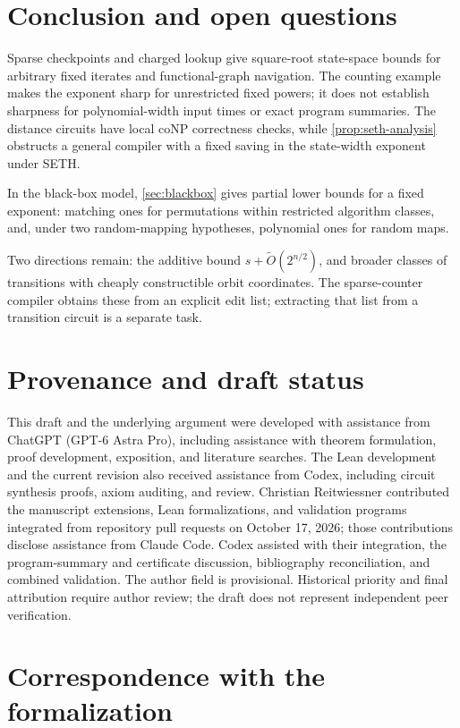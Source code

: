 \documentclass[11pt]{article}
\theoremstyle{definition}
\theoremstyle{remark}
\numberwithin{equation}{section}
\begin{document}
\section{Conclusion and open questions}\label{sec:scope}

Sparse checkpoints and charged lookup give square-root state-space bounds
for arbitrary fixed iterates and functional-graph navigation.  The counting
example makes the exponent sharp for unrestricted fixed powers; it does not
establish sharpness for polynomial-width input times or exact program summaries.
The distance circuits have local coNP correctness checks, while
\cref{prop:seth-analysis} obstructs a general compiler with a fixed saving
in the state-width exponent under SETH.

In the black-box model, \cref{sec:blackbox} gives partial lower bounds
for a fixed exponent: matching ones for permutations within restricted
algorithm classes, and, under two random-mapping hypotheses, polynomial
ones for random maps.

Two directions remain: the additive bound
$s+\widetilde O(2^{n/2})$, and broader classes of transitions with cheaply
constructible orbit coordinates.  The sparse-counter compiler obtains these
from an explicit edit list; extracting that list from a transition circuit
is a separate task.

\section*{Provenance and draft status}

This draft and the underlying argument were developed with assistance
from ChatGPT (GPT-6 Astra Pro), including assistance with theorem
formulation, proof development, exposition, and literature searches.
The Lean development and the current revision also received assistance
from Codex, including circuit synthesis proofs, axiom auditing, and review.
Christian Reitwiessner contributed the manuscript extensions, Lean
formalizations, and validation programs integrated from repository pull
requests on October 17, 2026; those contributions disclose assistance
from Claude Code.  Codex assisted with their integration, the program-summary
and certificate discussion, bibliography reconciliation, and combined
validation.  The author field is provisional.  Historical priority and final
attribution require author review; the draft does not represent
independent peer verification.

\appendix
\section{Correspondence with the formalization}\label{app:lean-details}
\end{document}
